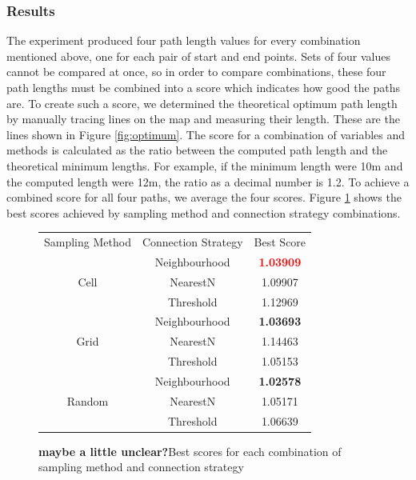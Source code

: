 \documentclass[conference]{IEEEtran}
\begin{document}
\subsubsection{Results}
The experiment produced four path length values for every combination mentioned above, one for each pair of start and end points. Sets of four values cannot be compared at once, so in order to compare combinations, these four path lengths must be combined into a score which indicates how good the paths are. To create such a score, we determined the theoretical optimum path length by manually tracing lines on the map and measuring their length. These are the lines shown in Figure \ref{fig:optimum}. The score for a combination of variables and methods is calculated as the ratio between the computed path length and the theoretical minimum lengths. For example, if the minimum length were 10m and the computed length were 12m, the ratio as a decimal number is 1.2. To achieve a combined score for all four paths, we average the four scores. Figure \ref{fig:sampleconntable} shows the best scores achieved by sampling method and connection strategy combinations.

\begin{figure}
  \centering
  \begin{tabular}{|c|c|c|}
    \cline{1-3}
    Sampling Method & Connection Strategy & Best Score      \\ \cline{1-3}
    \multirow{3}{*}{Cell} & Neighbourhood & \textbf{\textcolor{red}{1.03909}}         \\ \cline{2-3}
    & NearestN  & 1.09907                                     \\ \cline{2-3}
    & Threshold & 1.12969                                       \\ \cline{1-3}
    \multirow{3}{*}{Grid} & Neighbourhood & \textbf{1.03693}                          \\ \cline{2-3}
    & NearestN & 1.14463                                        \\ \cline{2-3}
    & Threshold & 1.05153                                       \\ \cline{1-3}
    \multirow{3}{*}{Random} & Neighbourhood & \textbf{1.02578}                        \\ \cline{2-3}
    & NearestN & 1.05171                                      \\ \cline{2-3}
    & Threshold & 1.06639                                     \\ \cline{1-3}
 \end{tabular}
  \caption{\textbf{maybe a little unclear?}Best scores for each combination of sampling method and connection strategy}
  \label{fig:sampleconntable}
\end{figure}
\end{document}
